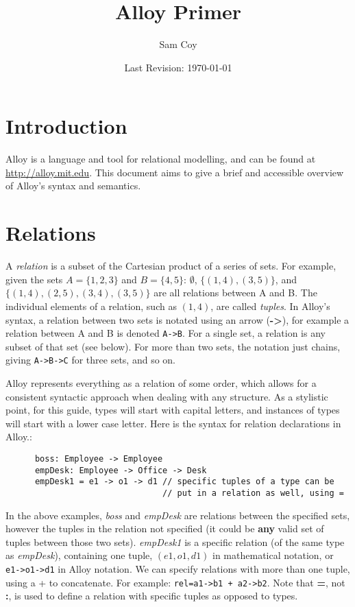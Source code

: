 \documentclass[10pt]{article}
\title{Alloy Primer}
\author{Sam Coy}
\date{Last Revision: \today}
\begin{document}
\maketitle

  \section*{Introduction}
    Alloy is a language and tool for relational modelling, and can be found at \url{http://alloy.mit.edu}. This document aims to give a brief and accessible overview of Alloy's syntax and semantics.

  \section*{Relations}
    A \textit{relation} is a subset of the Cartesian product of a series of sets. For example, given the sets $A=\{1, 2, 3\}$ and $B=\{4, 5\}$: $\emptyset$, $\{(1,4), (3, 5)\}$, and $\{(1,4), (2,5), (3,4), (3,5)\}$ are all relations between A and B. The individual elements of a relation, such as $(1,4)$, are called \textit{tuples}. In Alloy's syntax, a relation between two sets is notated using an arrow (\textbf{-\textgreater}), for example a relation between A and B is denoted \lstinline|A->B|. For a single set, a relation is any subset of that set (see below). For more than two sets, the notation just chains, giving \lstinline|A->B->C| for three sets, and so on.\par
    Alloy represents everything as a relation of some order, which allows for a consistent syntactic approach when dealing with any structure. As a stylistic point, for this guide, types will start with capital letters, and instances of types will start with a lower case letter. Here is the syntax for relation declarations in Alloy.:
    \begin{lstlisting}
      boss: Employee -> Employee
      empDesk: Employee -> Office -> Desk
      empDesk1 = e1 -> o1 -> d1 // specific tuples of a type can be
                                // put in a relation as well, using =
    \end{lstlisting} \par
    In the above examples, \textit{boss} and \textit{empDesk} are relations between the specified sets, however the tuples in the relation not specified (it could be \textbf{any} valid set of tuples between those two sets). \textit{empDesk1} is a specific relation (of the same type as \textit{empDesk}), containing one tuple, $(e1, o1, d1)$ in mathematical notation, or \lstinline|e1->o1->d1| in Alloy notation. We can specify relations with more than one tuple, using a + to concatenate. For example: \lstinline|rel=a1->b1 + a2->b2|. Note that \textbf{=}, not \textbf{:}, is used to define a relation with specific tuples as opposed to types.\par
\end{document}
